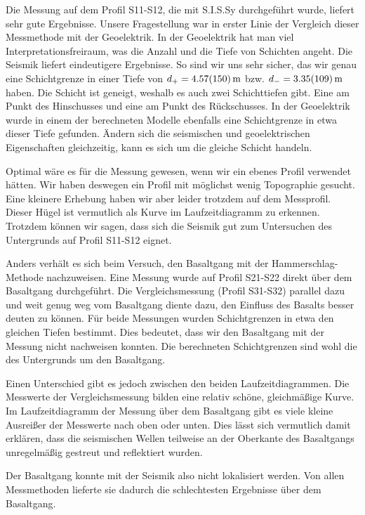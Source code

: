 Die Messung auf dem Profil S11-S12, die mit S.I.S.Sy durchgeführt wurde, liefert sehr gute Ergebnisse.
Unsere Fragestellung war in erster Linie der Vergleich dieser Messmethode mit der Geoelektrik. 
In der Geoelektrik hat man viel Interpretationsfreiraum, was die Anzahl und die Tiefe von Schichten angeht.
Die Seismik liefert eindeutigere Ergebnisse. So sind wir uns sehr sicher, das wir genau eine Schichtgrenze in einer Tiefe von $d_+= \SI{4,57 \pm 1,50}{m}$
bzw. $d_-= \SI{3,35 \pm 1,09}{m}$ haben. Die Schicht ist geneigt, weshalb es auch zwei Schichttiefen gibt. Eine am Punkt des Hinschusses und eine am Punkt des Rückschusses. In der Geoelektrik wurde in einem der berechneten Modelle ebenfalls eine Schichtgrenze in etwa dieser Tiefe gefunden. 
Ändern sich die seismischen und geoelektrischen Eigenschaften gleichzeitig, kann es sich um die gleiche Schicht handeln.

Optimal wäre es für die Messung gewesen, wenn wir ein ebenes Profil verwendet hätten. Wir haben deswegen ein Profil mit möglichst wenig Topographie gesucht.
Eine kleinere Erhebung haben wir aber leider trotzdem auf dem Messprofil. Dieser Hügel ist vermutlich als Kurve im Laufzeitdiagramm zu erkennen.
Trotzdem können wir sagen, dass sich die Seismik gut zum Untersuchen des Untergrunds auf Profil S11-S12 eignet.

Anders verhält es sich beim Versuch, den Basaltgang mit der Hammerschlag-Methode nachzuweisen. 
Eine Messung wurde auf Profil S21-S22 direkt über dem Basaltgang durchgeführt. Die Vergleichsmessung (Profil S31-S32) parallel dazu und weit genug weg vom Basaltgang diente dazu, den Einfluss des Basalts besser deuten zu können.
Für beide Messungen wurden Schichtgrenzen in etwa den gleichen Tiefen bestimmt. Dies bedeutet, dass wir den Basaltgang mit der Messung nicht nachweisen konnten. 
Die berechneten Schichtgrenzen sind wohl die des Untergrunds um den Basaltgang.

Einen Unterschied gibt es jedoch zwischen den beiden Laufzeitdiagrammen. Die Messwerte der Vergleichsmessung bilden eine relativ schöne, gleichmäßige Kurve. 
Im Laufzeitdiagramm der Messung über dem Basaltgang gibt es viele kleine Ausreißer der Messwerte nach oben oder unten. Dies lässt sich vermutlich damit erklären,
dass die seismischen Wellen teilweise an der Oberkante des Basaltgangs unregelmäßig gestreut und reflektiert wurden.

Der Basaltgang konnte mit der Seismik also nicht lokalisiert werden. Von allen Messmethoden lieferte sie dadurch die schlechtesten Ergebnisse über dem Basaltgang.